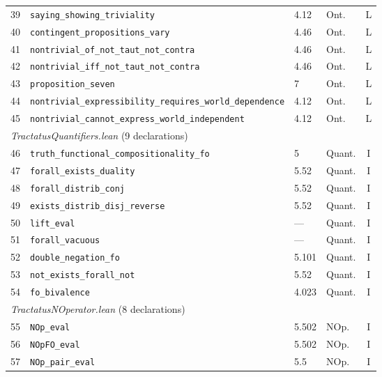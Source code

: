 \documentclass[10pt, letterpaper]{article}
\theoremstyle{definition}
\theoremstyle{remark}
\begin{document}
\begin{table}[p]
\begin{tabular}{@{}rlllc@{}}
39 & \texttt{saying\_showing\_triviality}                & 4.12    & Ont. & L \\
40 & \texttt{contingent\_propositions\_vary}             & 4.46    & Ont. & L \\
41 & \texttt{nontrivial\_of\_not\_taut\_not\_contra}     & 4.46    & Ont. & L \\
42 & \texttt{nontrivial\_iff\_not\_taut\_not\_contra}    & 4.46    & Ont. & L \\
43 & \texttt{proposition\_seven}                         & 7       & Ont. & L \\
44 & \texttt{nontrivial\_expressibility\_requires\_world\_dependence}
                                                         & 4.12    & Ont. & L \\
45 & \texttt{nontrivial\_cannot\_express\_world\_independent}
                                                         & 4.12    & Ont. & L \\
\midrule
\multicolumn{5}{l}{\emph{TractatusQuantifiers.lean} (9 declarations)} \\
\midrule
46 & \texttt{truth\_functional\_compositionality\_fo}    & 5       & Quant. & I \\
47 & \texttt{forall\_exists\_duality}                    & 5.52    & Quant. & I \\
48 & \texttt{forall\_distrib\_conj}                      & 5.52    & Quant. & I \\
49 & \texttt{exists\_distrib\_disj\_reverse}             & 5.52    & Quant. & I \\
50 & \texttt{lift\_eval}                                 & ---     & Quant. & I \\
51 & \texttt{forall\_vacuous}                            & ---     & Quant. & I \\
52 & \texttt{double\_negation\_fo}                       & 5.101   & Quant. & I \\
53 & \texttt{not\_exists\_forall\_not}                   & 5.52    & Quant. & I \\
54 & \texttt{fo\_bivalence}                              & 4.023   & Quant. & I \\
\midrule
\multicolumn{5}{l}{\emph{TractatusNOperator.lean} (8 declarations)} \\
\midrule
55 & \texttt{NOp\_eval}                                 & 5.502   & NOp. & I \\
56 & \texttt{NOpFO\_eval}                               & 5.502   & NOp. & I \\
57 & \texttt{NOp\_pair\_eval}                           & 5.5     & NOp. & I \\

\end{tabular}
\end{table}
\end{document}
